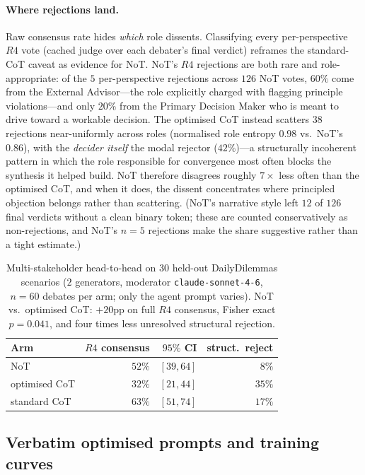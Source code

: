 \documentclass[11pt]{article}
\begin{document}
\paragraph{Where rejections land.} Raw consensus rate hides
\emph{which} role dissents. Classifying every per-perspective
$R4$ vote (cached judge over each debater's final verdict)
reframes the standard-CoT caveat as evidence for NoT. NoT's $R4$
rejections are both rare and role-appropriate: of the $5$
per-perspective rejections across $126$ NoT votes, $60\%$ come
from the External Advisor---the role explicitly charged with
flagging principle violations---and only $20\%$ from the Primary
Decision Maker who is meant to drive toward a workable decision.
The optimised CoT instead scatters $38$ rejections near-uniformly
across roles (normalised role entropy $0.98$ vs.\ NoT's $0.86$),
with the \emph{decider itself} the modal rejector ($42\%$)---a
structurally incoherent pattern in which the role responsible for
convergence most often blocks the synthesis it helped build. NoT
therefore disagrees roughly $7{\times}$ less often than the
optimised CoT, and when it does, the dissent concentrates where
principled objection belongs rather than scattering. (NoT's
narrative style left $12$ of $126$ final verdicts without a clean
binary token; these are counted conservatively as non-rejections,
and NoT's $n = 5$ rejections make the share suggestive rather than
a tight estimate.)

\begin{table}[!htbp]
\centering
\small
\setlength{\tabcolsep}{4pt}
\begin{tabular}{lrrr}
\toprule
Arm & $R4$ consensus & $95\%$ CI & struct.\ reject \\
\midrule
NoT                 & $52\%$ & $[39, 64]$ & $8\%$  \\
optimised CoT       & $32\%$ & $[21, 44]$ & $35\%$ \\
standard CoT        & $63\%$ & $[51, 74]$ & $17\%$ \\
\bottomrule
\end{tabular}
\caption{Multi-stakeholder head-to-head on $30$ held-out
DailyDilemmas scenarios ($2$ generators, moderator
\texttt{claude-sonnet-4-6}, $n = 60$ debates per arm; only the
agent prompt varies). NoT vs.\ optimised CoT: $+20$pp on full
$R4$ consensus, Fisher exact $p = 0.041$, and four times less
unresolved structural rejection.}
\label{tab:tg_debate}
\end{table}

\subsection{Verbatim optimised prompts and training curves}
\label{app:tg-verbatim}
\end{document}
